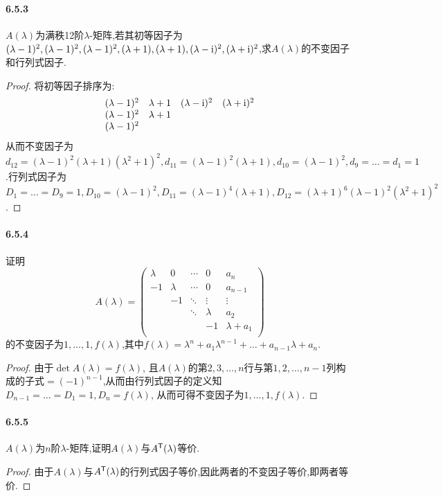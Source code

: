 \documentclass[11pt]{article}
\begin{document}
\paragraph{6.5.3}$A(\lambda)$为满秩12阶$\lambda$-矩阵,若其初等因子为$(\lambda-1)^2,(\lambda-1)^2,(\lambda-1)^2,(\lambda+1),(\lambda+1),(\lambda-\mathrm{i})^2,(\lambda+\mathrm{i})^2$,求$A(\lambda)$的不变因子和行列式因子.
\begin{proof}
    将初等因子排序为:
    $$\begin{array}{cccc}
        (\lambda -1)^2 & \lambda +1 & (\lambda -\mathrm{i})^2 & (\lambda +\mathrm{i})^2 \\
        (\lambda -1)^2 & \lambda +1 &  &  \\
        (\lambda -1)^2 &  &  &  \\
    \end{array}$$
    从而不变因子为$d_{12}=(\lambda-1)^2(\lambda+1)(\lambda^2+1)^2, d_{11}=(\lambda-1)^2(\lambda+1), d_{10}=(\lambda-1)^2, d_9=\dots=d_1=1$.行列式因子为$D_1=\dots=D_9=1,D_{10}=(\lambda-1)^2, D_{11}=(\lambda-1)^4(\lambda+1), D_{12}=(\lambda+1)^6(\lambda-1)^2(\lambda^2+1)^2$.
\end{proof}
\paragraph{6.5.4}证明
$$A(\lambda)=\begin{pmatrix}
    \lambda  & 0 & \cdots & 0 & a_n \\
    -1 & \lambda  & \cdots & 0 & a_{n-1} \\
     & -1 & \ddots & \vdots & \vdots \\
     &  & \ddots & \lambda  & a_2 \\
     &  &  & -1 & \lambda+a_1  \\
\end{pmatrix}$$
的不变因子为$1,\dots,1,f(\lambda)$,其中$f(\lambda)=\lambda^n+a_1\lambda^{n-1}+\dots+a_{n-1}\lambda+a_n$.
\begin{proof}
    由于$\det A(\lambda)=f(\lambda)$, 且$A(\lambda)$的第$2,3,\dots,n$行与第$1,2,\dots,n-1$列构成的子式$=(-1)^{n-1}$,从而由行列式因子的定义知$D_{n-1}=\dots=D_1=1, D_n=f(\lambda)$, 从而可得不变因子为$1,\dots,1,f(\lambda)$.
\end{proof}
\paragraph{6.5.5}$A(\lambda)$为$n$阶$\lambda$-矩阵,证明$A(\lambda)$与$A^{\mathsf{T}}(\lambda)$等价.
\begin{proof}
    由于$A(\lambda)$与$A^{\mathsf{T}}(\lambda)$的行列式因子等价,因此两者的不变因子等价,即两者等价.
\end{proof}
\end{document}
